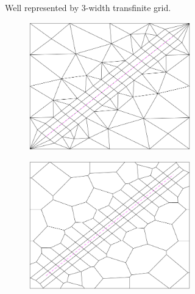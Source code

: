 \begin{figure}[htp]
\begin{subfigure}[b]{\textwidth}
\begin{subfigure}[b]{0.35\textwidth}
        \end{subfigure}
        \caption{Well represented by 3-width transfinite grid.}
        \label{fig:trans-well-1}
    \end{subfigure}
    \begin{subfigure}[b]{\textwidth}
        \centering
        \begin{subfigure}[b]{0.35\textwidth}
            \centering
            \includegraphics[width=\textwidth]{report/Images/Combining software/Wells as transfinite grids/cell_constraint_as_transfinite_delaunay_2.png}
        \end{subfigure}
        \begin{subfigure}[b]{0.35\textwidth}
            \centering
            \includegraphics[width=\textwidth]{report/Images/Combining software/Wells as transfinite grids/cell_constraint_as_transfinite_pebi_2.png}

\end{subfigure}
\end{subfigure}
\end{figure}
